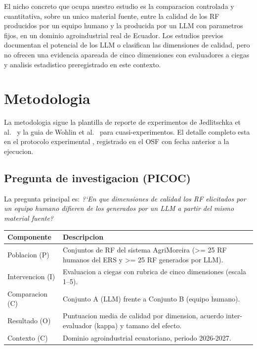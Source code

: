 \documentclass[11pt,a4paper]{article}
\begin{document}
El nicho concreto que ocupa nuestro estudio es la comparacion controlada y
cuantitativa, sobre un unico material fuente, entre la calidad de los RF
producidos por un equipo humano y la producida por un LLM con parametros
fijos, en un dominio agroindustrial real de Ecuador. Los estudios previos
documentan el potencial de los LLM o clasifican las dimensiones de calidad,
pero no ofrecen una evidencia apareada de cinco dimensiones con evaluadores a
ciegas y analisis estadistico preregistrado en este contexto.

\section{Metodologia}

La metodologia sigue la plantilla de reporte de experimentos de Jedlitschka
et al.\ \cite{jedlitschka2008} y la guia de Wohlin et al.\ \cite{wohlin2012}
para cuasi-experimentos. El detalle completo esta en el protocolo experimental
\cite{protocolo}, registrado en el OSF con fecha anterior a la ejecucion.

\subsection{Pregunta de investigacion (PICOC)}
\label{subsec:rq}
La pregunta principal es: \emph{?`En que dimensiones de calidad los RF
elicitados por un equipo humano difieren de los generados por un LLM a partir
del mismo material fuente?}

\begin{center}
\begin{tabular}{>{\raggedright\arraybackslash}p{3cm} p{12cm}}
\toprule
\textbf{Componente} & \textbf{Descripcion} \\
\midrule
Poblacion (P) & Conjuntos de RF del sistema AgriMoreira (>= 25 RF humanos del
ERS y >= 25 RF generados por LLM). \\
Intervencion (I) & Evaluacion a ciegas con rubrica de cinco dimensiones
(escala 1--5). \\
Comparacion (C) & Conjunto A (LLM) frente a Conjunto B (equipo humano). \\
Resultado (O) & Puntuacion media de calidad por dimension, acuerdo
inter-evaluador (kappa) y tamano del efecto. \\
Contexto (C) & Dominio agroindustrial ecuatoriano, periodo 2026-2027. \\
\bottomrule
\end{tabular}
\end{center}
\end{document}

